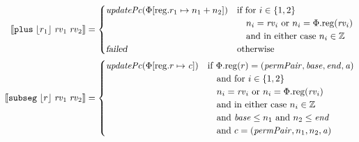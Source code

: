 \documentclass[a4paper]{article}
\newcommand{\update}[2]{[#1 \mapsto #2]}
\newcommand{\sem}[1]{\left\llbracket #1 \right\rrbracket}
\newcommand{\var}[1]{\mathit{#1}}
\newcommand{\rv}{\var{rv}}
\newcommand{\gl}{\var{g}}
\newcommand{\addr}{\var{a}}
\newcommand{\start}{\var{base}}
\newcommand{\addrend}{\var{end}}
\newcommand{\perm}{\var{perm}}
\newcommand{\permp}{\var{permPair}}
\newcommand{\stdcap}[1][(\perm,\gl)]{\left(#1,\start,\addrend,\addr \right)}
\newcommand{\plainproj}[1]{\mathrm{#1}}
\newcommand{\memreg}[1][\Phi]{#1.\plainproj{reg}}
\newcommand{\updateReg}[3][\Phi]{#1\update{\plainproj{reg}.#2}{#3}}
\newcommand{\failed}{\textsl{failed}}
\newcommand{\plainfun}[2]{
  \ifthenelse{\equal{#2}{}}
  {\mathit{#1}}
  {\mathit{#1}(#2)}
}
\newcommand{\stdUpdatePc}[1]{\plainfun{updatePc}{#1}}
\newcommand{\ints}{\mathbb{Z}}
\newcommand{\refreg}[1]{\lfloor #1 \rfloor}
\newcommand{\zinstr}[1]{\mathtt{#1}}
\newcommand{\threeinstr}[4]{\zinstr{#1} \; #2 \; #3 \; #4}
\newcommand{\subseg}[3]{\threeinstr{subseg}{#1}{#2}{#3}}
\newcommand{\plus}[3]{\threeinstr{plus}{#1}{#2}{#3}}
\begin{document}
\begin{align*}
  \sem{\plus{\refreg{r_1}}{\rv_1}{\rv_2}}               & =
                                                          \begin{cases}
                                                            \stdUpdatePc{\updateReg{r_1}{n_1+n_2}} &
                                                            \arraycolsep=0pt
                                                            \begin{array}[t]{l}
                                                              \text{if for $i \in \{1,2\}$}\\
                                                              \quad\text{$n_i = \rv_i$ or $n_i = \memreg(\rv_i)$}\\
                                                              \quad\text{and in either case $n_i \in \ints$}
                                                            \end{array}\\
                                                            \failed & \text{otherwise}
                                                          \end{cases}\\
  \sem{\subseg{\refreg{r}}{\rv_1}{\rv_2}} & = 
                                            \begin{cases}
                                              \stdUpdatePc{\updateReg{r}{\var{c}}} &
                                              \arraycolsep=0pt
                                              \begin{array}[t]{l}
                                                \text{if $\memreg(r) = \stdcap[\permp]$} \\
                                                \quad\text{and for $i \in \{1,2\}$}\\
                                                \quad\text{$n_i = \rv_i$ or $n_i = \memreg(\rv_i)$}\\
                                                \quad\text{and in either case $n_i \in \ints$}\\
                                                \quad\text{and $\start \leq n_1$ and $n_2 \leq \addrend$}\\
                                                \quad\text{and $c = (\permp,n_1,n_2,\addr)$}
                                              \end{array} \\

\end{cases}
\end{align*}
\end{document}

